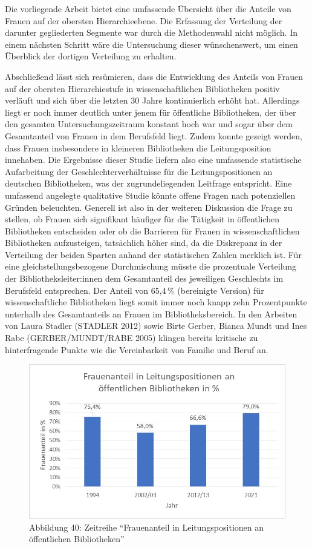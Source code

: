 \documentclass[a4paper,
fontsize=11pt,
oneside,
numbers=noperiodatend,
parskip=half-,
bibliography=totoc,
final
]{scrartcl}
\begin{document}
Die vorliegende Arbeit bietet eine umfassende Übersicht über die Anteile
von Frauen auf der obersten Hierarchieebene. Die Erfassung der
Verteilung der darunter gegliederten Segmente war durch die Methodenwahl
nicht möglich. In einem nächsten Schritt wäre die Untersuchung dieser
wünschenswert, um einen Überblick der dortigen Verteilung zu erhalten.

Abschließend lässt sich resümieren, dass die Entwicklung des Anteils von
Frauen auf der obersten Hierarchiestufe in wissenschaftlichen
Bibliotheken positiv verläuft und sich über die letzten 30 Jahre
kontinuierlich erhöht hat. Allerdings liegt er noch immer deutlich unter
jenem für öffentliche Bibliotheken, der über den gesamten
Untersuchungszeitraum konstant hoch war und sogar über dem Gesamtanteil
von Frauen in dem Berufsfeld liegt. Zudem konnte gezeigt werden, dass
Frauen insbesondere in kleineren Bibliotheken die Leitungsposition
innehaben. Die Ergebnisse dieser Studie liefern also eine umfassende
statistische Aufarbeitung der Geschlechterverhältnisse für die
Leitungspositionen an deutschen Bibliotheken, was der zugrundeliegenden
Leitfrage entspricht. Eine umfassend angelegte qualitative Studie könnte
offene Fragen nach potenziellen Gründen beleuchten. Generell ist also in
der weiteren Diskussion die Frage zu stellen, ob Frauen sich signifikant
häufiger für die Tätigkeit in öffentlichen Bibliotheken entscheiden oder
ob die Barrieren für Frauen in wissenschaftlichen Bibliotheken
aufzusteigen, tatsächlich höher sind, da die Diskrepanz in der
Verteilung der beiden Sparten anhand der statistischen Zahlen merklich
ist. Für eine gleichstellungsbezogene Durchmischung müsste die
prozentuale Verteilung der Bibliotheksleiter:innen dem Gesamtanteil des
jeweiligen Geschlechts im Berufsfeld entsprechen. Der Anteil von 65,4\,\%
(bereinigte Version) für wissenschaftliche Bibliotheken liegt somit
immer noch knapp zehn Prozentpunkte unterhalb des Gesamtanteils an
Frauen im Bibliotheksbereich. In den Arbeiten von Laura Stadler (STADLER
2012) sowie Birte Gerber, Bianca Mundt und Ines Rabe (GERBER/MUNDT/RABE
2005) klingen bereits kritische zu hinterfragende Punkte wie die
Vereinbarkeit von Familie und Beruf an.

\begin{figure}
\centering
\includegraphics{img/Abb_40_Zeitreihe-OB.jpg}
\caption{Abbildung 40: Zeitreihe \enquote{Frauenanteil in
Leitungspositionen an öffentlichen Bibliotheken}}
\end{figure}
\end{document}
